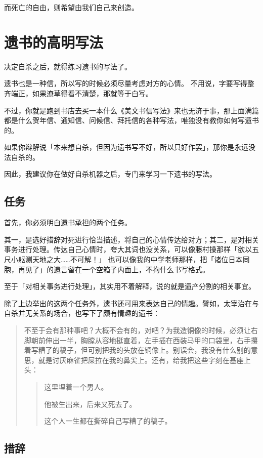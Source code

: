 \documentclass[UTF8]{ctexart}
\begin{document}
而死亡的自由，则希望由我们自己来创造。

\section{遗书的高明写法}

决定自杀之后，就得练习遗书的写法了。

遗书也是一种信，所以写的时候必须尽量考虑对方的心情。
不用说，字要写得整齐端正，如果潦草得看不清楚，那就等于白写。

不过，你就是跑到书店去买一本什么《美文书信写法》来也无济于事，那上面满篇都是什么贺年信、通知信、问候信、拜托信的各种写法，唯独没有教你如何写遗书的。

如果你辩解说「本来想自杀，但因为遗书写不好，所以只好作罢」，那你是永远没法自杀的。

因此，我建议你在做好自杀机器之后，专门来学习一下遗书的写法。

\subsection{任务}
首先，你必须明白遗书承担的两个任务。

其一，是选好措辞对死进行恰当描述，将自己的心情传达给对方；其二，是对相关事务进行处理。传达自己心情时，夸大其词也没关系，可以像藤村操那样「欲以五尺小躯测天地之大……不可解！」
也可以像我的中学老师那样，把「诸位日本同胞，再见了」的遗言留在一个空箱子内面上，不拘什么书写格式。

至于「对相关事务进行处理」，其实用不着解释，说的就是遗产分割的相关事宜。

除了上边举出的这两个任务外，遗书还可用来表达自己的情趣。譬如，太宰治在与自杀并无关系的场合，也写下了颇有情趣的遗书：

\begin{quotation}
不至于会有那种事吧？大概不会有的，对吧？为我造铜像的时候，必须让右脚朝前伸出一半，胸膛从容地挺直着，左手插在西装马甲的口袋里，右手攥着写糟了的稿子，但可别把我的头放在铜像上。别误会，我没有什么别的意思，就是讨厌麻雀把屎拉在我的鼻尖上。还有，给我把这些字刻在基座上头：

\begin{verse}
这里埋着一个男人。

他被生出来，后来又死去了。

这个人一生都在撕碎自己写糟了的稿子。
\end{verse}

\end{quotation}

\subsection{措辞}
\end{document}
